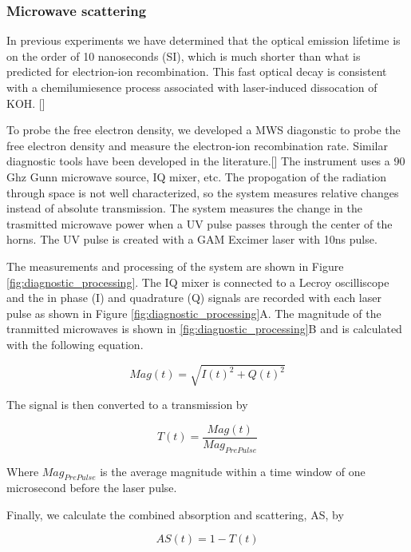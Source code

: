 \subsubsection{Microwave scattering}

 In previous experiments we have determined that the optical emission lifetime is on the order of 10 nanoseconds (SI), which is much shorter than what is predicted for electrion-ion recombination. This fast optical decay is consistent with a chemilumiesence process associated with laser-induced dissocation of KOH. [] 

To probe the free electron density, we developed a MWS diagonstic to probe the free electron density and measure the electron-ion recombination rate. Similar diagnostic tools have been developed in the literature.[] The instrument uses a 90 Ghz Gunn microwave source, IQ mixer, etc. The propogation of the radiation through space is not well characterized, so the system measures relative changes instead of absolute transmission. The system measures the change in the trasmitted microwave power when a UV pulse passes through the center of the horns. The UV pulse is created with a GAM Excimer laser with 10ns pulse. 

The measurements and processing of the system are shown in Figure \ref{fig:diagnostic_processing}. The IQ mixer is connected to a Lecroy oscilliscope and the in phase (I) and quadrature (Q) signals are recorded with each laser pulse as shown in Figure \ref{fig:diagnostic_processing}A. The magnitude of the tranmitted microwaves is shown in \ref{fig:diagnostic_processing}B and is calculated with the following equation.

\begin{equation}
    Mag(t) = \sqrt{I(t)^2 + Q(t)^2}
\end{equation}

The signal is then converted to a transmission by 

\begin{equation}
    T(t) = \frac{Mag(t)}{Mag_{Pre Pulse}}
\end{equation}

Where $Mag_{Pre Pulse}$ is the average magnitude within a time window of one microsecond before the laser pulse. 

Finally, we calculate the combined absorption and scattering, AS, by

\begin{equation}
    AS(t) = 1 - T(t)
\end{equation}

